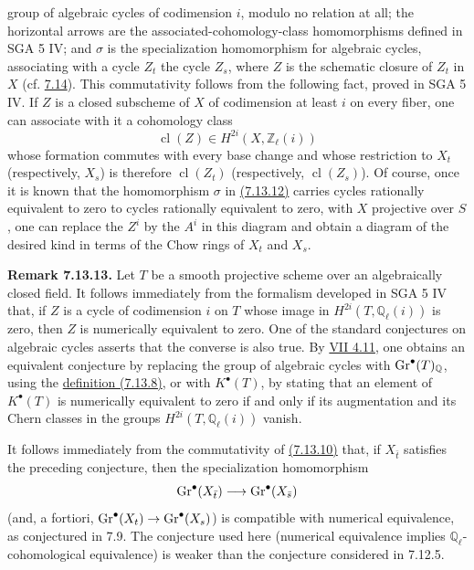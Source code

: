group of algebraic cycles of codimension $i$, modulo no relation at all; the
horizontal arrows are the associated-cohomology-class homomorphisms defined
in SGA 5 IV; and $\sigma$ is the specialization homomorphism for algebraic
cycles, associating with a cycle $Z_t$ the cycle $Z_s$, where $Z$ is the
schematic closure of $Z_t$ in $X$ (cf. \hyperlink{sga6.e10.sec.7.14}{7.14}). This commutativity follows from
the following fact, proved in SGA 5 IV. If $Z$ is a closed subscheme of $X$
of codimension at least $i$ on every fiber, one can associate with it a
cohomology class
\[
\operatorname{cl}(Z)\in H^{2i}(X,\mathbb Z_\ell(i))
\]
whose formation commutes with every base change and whose restriction to
$X_t$ (respectively, $X_s$) is therefore
$\operatorname{cl}(Z_t)$ (respectively, $\operatorname{cl}(Z_s)$). Of course,
once it is known that the homomorphism $\sigma$ in \hyperlink{sga6.e10.eq.7-13-12}{(7.13.12)} carries cycles
rationally equivalent to zero to cycles rationally equivalent to zero, with
$X$ projective over $S$,
one can replace the $Z^i$ by the $A^i$ in this diagram and obtain a diagram
of the desired kind in terms of the Chow rings of $X_t$ and $X_s$.

\textbf{Remark 7.13.13.}
Let $T$ be a smooth projective scheme over an algebraically closed field. It
follows immediately from the formalism developed in SGA 5 IV that, if $Z$ is
a cycle of codimension $i$ on $T$ whose image in
$H^{2i}(T,\mathbb Q_\ell(i))$ is zero, then $Z$ is numerically equivalent to
zero. One of the standard conjectures on algebraic cycles asserts that the
converse is also true. By \hyperlink{sga6.e07.prop.4-11}{VII 4.11}, one obtains an equivalent conjecture by
replacing the group of algebraic cycles with $\operatorname{Gr}^\bullet(T)_{\mathbb Q}$,
using the \hyperlink{sga6.e10.eq.7-13-8}{definition (7.13.8)}, or with $K^\bullet(T)$, by stating that an
element of $K^\bullet(T)$ is numerically equivalent to zero if and only if
its augmentation and its Chern classes in the groups
$H^{2i}(T,\mathbb Q_\ell(i))$ vanish.

It follows immediately from the commutativity of \hyperlink{sga6.e10.eq.7-13-10}{(7.13.10)} that, if
$X_{\bar t}$ satisfies the preceding conjecture, then the specialization
homomorphism
\[
\operatorname{Gr}^\bullet(X_{\bar t})\longrightarrow\operatorname{Gr}^\bullet(X_{\bar s})
\]
(and, a fortiori, $\operatorname{Gr}^\bullet(X_t)\to\operatorname{Gr}^\bullet(X_s)$) is compatible with
numerical equivalence, as conjectured in 7.9. The conjecture used here
(numerical equivalence implies $\mathbb Q_\ell$-cohomological equivalence) is
weaker than the conjecture considered in 7.12.5.

